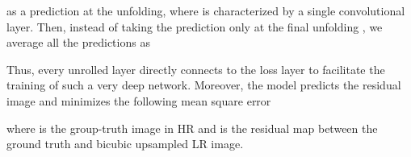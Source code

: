\documentclass[10pt,twocolumn,letterpaper]{article}
\begin{document}
as a prediction at the  unfolding, where  is characterized by a single convolutional layer.  Then, instead of taking the prediction only at the final unfolding , we average all the predictions as 

Thus, every unrolled layer directly connects to the loss layer to facilitate the training of such a very deep network.  Moreover, the model predicts the residual image and minimizes the following mean square error 

where  is the group-truth image in HR and  is the residual map between the ground truth and bicubic upsampled LR image.  






































 
\end{document}
